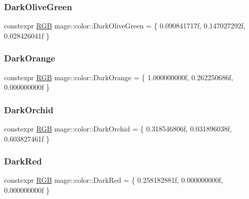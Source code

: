 \subsubsection{\texorpdfstring{Dark\+Olive\+Green}{DarkOliveGreen}}
{\footnotesize\ttfamily constexpr \mbox{\hyperlink{structmage_1_1_r_g_b}{R\+GB}} mage\+::color\+::\+Dark\+Olive\+Green = \{ 0.\+090841717f, 0.\+147027292f, 0.\+028426041f \}}

\mbox{\label{namespacemage_1_1color_ab204ba538e4ca171b5ae250023e334b0}} 
\subsubsection{\texorpdfstring{Dark\+Orange}{DarkOrange}}
{\footnotesize\ttfamily constexpr \mbox{\hyperlink{structmage_1_1_r_g_b}{R\+GB}} mage\+::color\+::\+Dark\+Orange = \{ 1.\+000000000f, 0.\+262250686f, 0.\+000000000f \}}

\mbox{\label{namespacemage_1_1color_ae1054dbb15cd00a4ffb9c5644d8e2319}} 
\subsubsection{\texorpdfstring{Dark\+Orchid}{DarkOrchid}}
{\footnotesize\ttfamily constexpr \mbox{\hyperlink{structmage_1_1_r_g_b}{R\+GB}} mage\+::color\+::\+Dark\+Orchid = \{ 0.\+318546806f, 0.\+031896038f, 0.\+603827461f \}}

\mbox{\label{namespacemage_1_1color_af3e92bec90aaaae7e505af23ff81ecdf}} 
\subsubsection{\texorpdfstring{Dark\+Red}{DarkRed}}
{\footnotesize\ttfamily constexpr \mbox{\hyperlink{structmage_1_1_r_g_b}{R\+GB}} mage\+::color\+::\+Dark\+Red = \{ 0.\+258182881f, 0.\+000000000f, 0.\+000000000f \}}

\mbox{\label{namespacemage_1_1color_ab179d9d88e39d4aab420b3b5c774b416}} 
